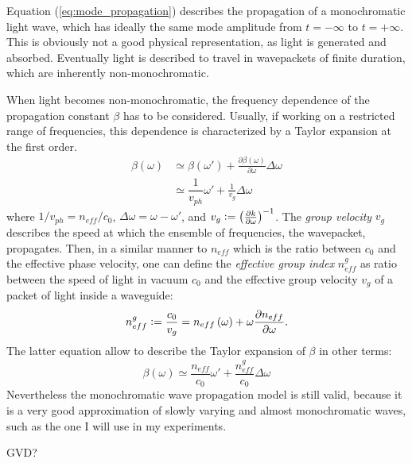 Equation (\ref{eq:mode_propagation}) describes the propagation of a monochromatic light wave, which has ideally the same mode amplitude from $t=-\infty$ to $t=+\infty$.
This is obviously not a good physical representation, as light is generated and absorbed.
Eventually light is described to travel in wavepackets of finite duration, which are inherently non-monochromatic.

When light becomes non-monochromatic, the frequency dependence of the propagation constant $\beta$ has to be considered.
Usually, if working on a restricted range of frequencies, this dependence is characterized by a Taylor expansion at the first order.
\begin{subequations}
\begin{align}
	\beta\left(\omega\right)
		&\simeq \beta\left(\omega'\right) + \frac{\partial \beta\left(\omega\right) }{\partial \omega} \Delta\omega \label{eq:beta_taylor}\\
		&\simeq \dfrac{1}{v_{ph}} \omega' + \frac{1}{v_g} \Delta\omega \label{eq:beta_taylor_v}
\end{align}
\end{subequations}
where $1/v_{ph} = n_{eff}/c_0$, $\Delta\omega = \omega-\omega'$, and $v_g \vcentcolon= \left( \frac{\partial k}{\partial \omega}\right)^{-1}$.
The \textit{group velocity} $v_g$ describes the speed at which the ensemble of frequencies, the wavepacket, propagates.
Then, in a similar manner to $n_{eff}$ which is the ratio between $c_0$ and the effective phase velocity, one can define the \textit{effective group index} $n_{eff}^g$ as ratio between the speed of light in vacuum $c_0$ and the effective group velocity $v_g$ of a packet of light inside a waveguide:
\begin{equation}
	n_{eff}^g \vcentcolon= \dfrac{c_0}{v_g} = n_{eff}\left( \omega \right) +\omega\dfrac{\partial n_{eff}}{\partial \omega}.
	\label{eq:neff_group}
\end{equation}
The latter equation allow to describe the Taylor expansion of $\beta$ in other terms:
\begin{equation}
	\beta\left(\omega\right) \simeq \frac{n_{eff}}{c_0}\omega' + \frac{n_{eff}^g}{c_0} \Delta\omega
	\label{eq:beta_taylor_n}
\end{equation}
Nevertheless the monochromatic wave propagation model is still valid, because it is a very good approximation of slowly varying and almost monochromatic waves, such as the one I will use in my experiments.

\LARGE GVD? \normalsize


